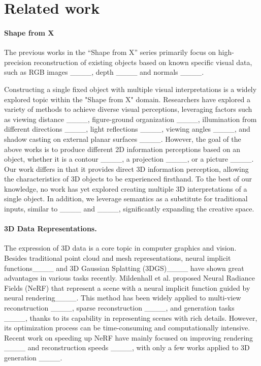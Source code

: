 \section{Related work}
\paragraph{Shape from X} The previous works in the ``Shape from X'' series primarily focus on high-precision reconstruction of existing objects based on known specific visual data, such as RGB images ____, depth ____ and normals ____. 

Constructing a single fixed object with multiple visual interpretations is a widely explored topic within the "Shape from X" domain. Researchers have explored a variety of methods to achieve diverse visual perceptions, leveraging factors such as viewing distance ____, figure-ground organization ____, illumination from different directions ____, light reflections ____, viewing angles ____, and shadow casting on external planar surfaces ____. 
However, the goal of the above works is to produce different 2D information perceptions based on an object, whether it is a contour ____, a projection ____, or a picture ____. Our work differs in that it provides direct 3D information perception, allowing the characteristics of 3D objects to be experienced firsthand. To the best of our knowledge, no work has yet explored creating multiple 3D interpretations of a single object. In addition, we leverage semantics as a substitute for traditional inputs, similar to ____ and ____, significantly expanding the creative space. 

\paragraph{3D Data Representations.} The expression of 3D data is a core topic in computer graphics and vision. Besides traditional point cloud and mesh representations, neural implicit functions____ and 3D Gaussian Splatting (3DGS)____ have shown great advantages in various tasks recently. 
Mildenhall et al. proposed Neural Radiance Fields (NeRF) that represent a scene with a neural implicit function guided by neural rendering____. This method has been widely applied to multi-view reconstruction ____, sparse reconstruction ____, and generation tasks ____, thanks to its capability in representing scenes with rich details. However, its optimization process can be time-consuming and computationally intensive. Recent work on speeding up NeRF have mainly focused on improving rendering  ____ and reconstruction speeds ____, with only a few works applied to 3D generation ____.

